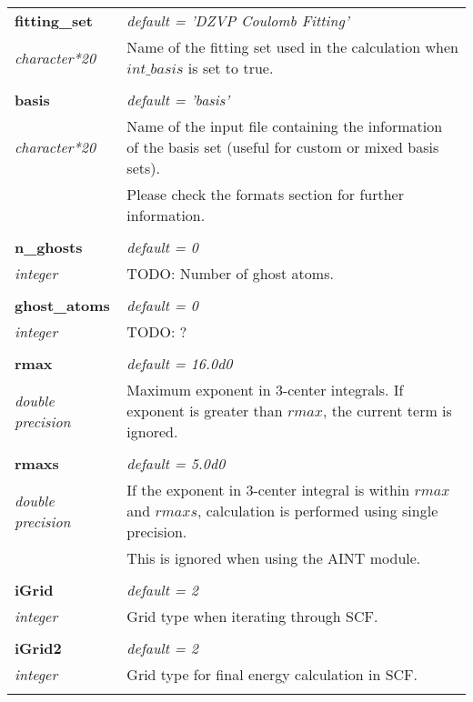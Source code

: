 \begin{Spacing}{1.0}
\begin{longtable}{ p{} p{} }
   \textbf{fitting\_set}
   &  \textit{default = 'DZVP Coulomb Fitting'}
   \\*\textit{character*20}
   & Name of the fitting set used in the calculation when
   $int\_basis$ is set to true.\\* \\

   \textbf{basis}
   &  \textit{default = 'basis'}
   \\*\textit{character*20}
   & Name of the input file containing the information
   of the basis set (useful for custom or mixed basis
   sets).\\*
   & Please check the formats section for further
   information.\\* \\

   \textbf{n\_ghosts}
   &  \textit{default = 0}
   \\*\textit{integer}
   & TODO: Number of ghost atoms.\\* \\

   \textbf{ghost\_atoms}
   &  \textit{default = 0}
   \\*\textit{integer}
   & TODO: ?\\* \\

   \textbf{rmax}
   &  \textit{default = 16.0d0}
   \\*\textit{double precision}
   & Maximum exponent in 3-center integrals. If exponent
   is greater than $rmax$, the current term is ignored.
   \\* \\

   \textbf{rmaxs}
   &  \textit{default = 5.0d0}
   \\*\textit{double precision}
   & If the exponent in 3-center integral is within
   $rmax$ and $rmaxs$, calculation is performed using
    single precision.\\*
   & This is ignored when using the AINT module. \\* \\

   \textbf{iGrid}
   &  \textit{default = 2}
   \\*\textit{integer}
   & Grid type when iterating through SCF.\\* \\

   \textbf{iGrid2}
   &  \textit{default = 2}
   \\*\textit{integer}
   & Grid type for final energy calculation in SCF.\\* \\


\end{longtable}
\end{Spacing}
